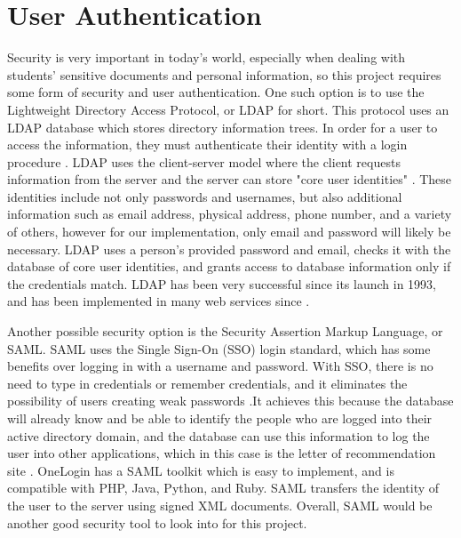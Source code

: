 \documentclass[letterpaper, 10pt, draftclsnofoot,onecolumn]{IEEEtran}
\begin{document}
\section {User Authentication}
Security is very important in today's world, especially when dealing with students' sensitive documents and personal information, so this project requires some form of security and user authentication. One such option is to use the Lightweight Directory Access Protocol, or LDAP for short. This protocol uses an LDAP database which stores directory information trees. In order for a user to access the information, they must authenticate their identity with a login procedure \cite {LDAP}. LDAP uses the client-server model where the client requests information from the server and the server can store "core user identities" \cite{LDAP}. These identities include not only passwords and usernames, but also additional information such as email address, physical address, phone number, and a variety of others, however for our implementation, only email and password will likely be necessary. LDAP uses a person's provided password and email, checks it with the database of core user identities, and grants access to database information only if the credentials match. LDAP has been very successful since its launch in 1993, and has been implemented in many web services since \cite {LDAP}.

Another possible security option is the Security Assertion Markup Language, or SAML. SAML uses the Single Sign-On (SSO) login standard, which has some benefits over logging in with a username and password. With SSO, there is no need to type in credentials or remember credentials, and it eliminates the possibility of users creating weak passwords \cite{SAML}.It achieves this because the database will already know and be able to identify the people who are logged into their active directory domain, and the database can use this information to log the user into other applications, which in this case is the letter of recommendation site \cite{SAML}. OneLogin has a SAML toolkit which is easy to implement, and is compatible with PHP, Java, Python, and Ruby. SAML transfers the identity of the user to the server using signed XML documents. Overall, SAML would be another good security tool to look into for this project.
\end{document}

